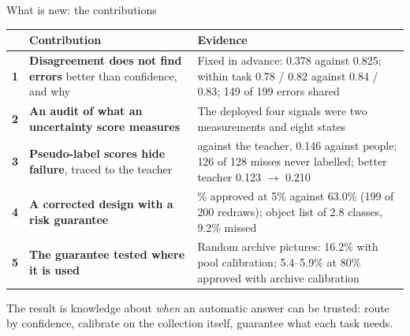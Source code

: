 \documentclass[aspectratio=169,10pt]{beamer}
\newcommand{\takeaway}[1]{\vfill\begin{keybox}#1\end{keybox}}
\begin{document}
\begin{frame}{What is new: the contributions}
\footnotesize
\renewcommand{\arraystretch}{1.3}
\begin{tabularx}{\textwidth}{@{}c >{\raggedright\arraybackslash}p{4.6cm} >{\raggedright\arraybackslash}X@{}}
\toprule
& \textbf{Contribution} & \textbf{Evidence}\\
\midrule
\textbf{\color{navy}1} & \textbf{Disagreement does not find errors} better than confidence, and why & Fixed in advance: 0.378 against 0.825; within task 0.78 / 0.82 against 0.84 / 0.83; 149 of 199 errors shared\\
\textbf{\color{navy}2} & \textbf{An audit of what an uncertainty score measures} & The deployed four signals were two measurements and eight states\\
\textbf{\color{navy}3} & \textbf{Pseudo-label scores hide failure}, traced to the teacher & 0.768 against the teacher, 0.146 against people; 126 of 128 misses never labelled; better teacher 0.123 $\to$ 0.210\\
\textbf{\color{navy}4} & \textbf{A corrected design with a risk guarantee} & 76.4\% approved at 5\% against 63.0\% (199 of 200 redraws); object list of 2.8 classes, 9.2\% missed\\
\textbf{\color{navy}5} & \textbf{The guarantee tested where it is used} & Random archive pictures: 16.2\% with pool calibration; 5.4--5.9\% at 80\% approved with archive calibration\\
\bottomrule
\end{tabularx}
\takeaway{The result is knowledge about \emph{when} an automatic answer can be trusted: route by confidence, calibrate on the collection itself, guarantee what each task needs.}
\end{frame}
\end{document}
